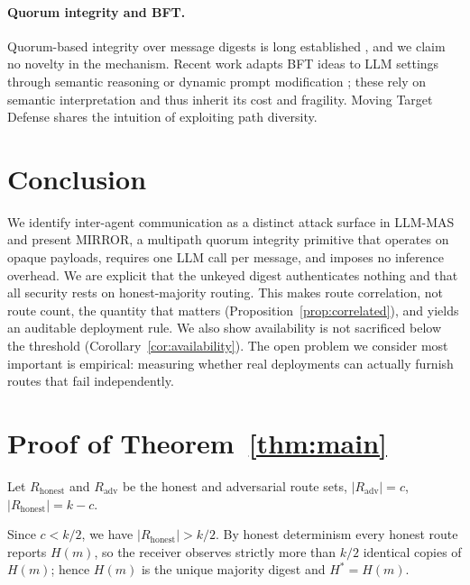 \documentclass{article}
\begin{document}
\paragraph{Quorum integrity and BFT.}
Quorum-based integrity over message digests is long established \citep{lamport1982byzantine, castro1999pbft}, and we claim no novelty in the mechanism. Recent work adapts BFT ideas to LLM settings through semantic reasoning \citep{zheng2025bft} or dynamic prompt modification \citep{jailbreaker2024}; these rely on semantic interpretation and thus inherit its cost and fragility. Moving Target Defense \citep{skowyra2020mtd} shares the intuition of exploiting path diversity.

\section{Conclusion}

We identify inter-agent communication as a distinct attack surface in LLM-MAS and present MIRROR, a multipath quorum integrity primitive that operates on opaque payloads, requires one LLM call per message, and imposes no inference overhead. We are explicit that the unkeyed digest authenticates nothing and that all security rests on honest-majority routing. This makes route correlation, not route count, the quantity that matters (Proposition~\ref{prop:correlated}), and yields an auditable deployment rule. We also show availability is not sacrificed below the threshold (Corollary~\ref{cor:availability}). The open problem we consider most important is empirical: measuring whether real deployments can actually furnish routes that fail independently.




\newpage
\appendix

\section{Proof of Theorem~\ref{thm:main}}
\label{app:proof}

Let $R_{\mathrm{honest}}$ and $R_{\mathrm{adv}}$ be the honest and adversarial route sets, $|R_{\mathrm{adv}}| = c$, $|R_{\mathrm{honest}}| = k - c$.

Since $c < k/2$, we have $|R_{\mathrm{honest}}| > k/2$. By honest determinism every honest route reports $H(m)$, so the receiver observes strictly more than $k/2$ identical copies of $H(m)$; hence $H(m)$ is the unique majority digest and $H^\ast = H(m)$.
\end{document}
